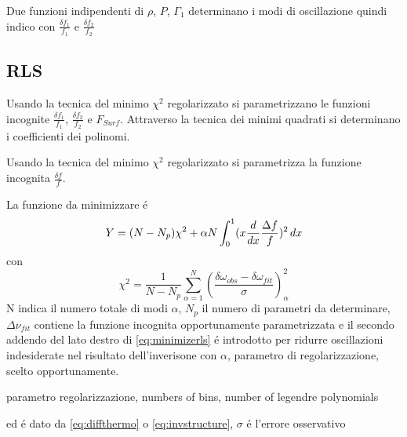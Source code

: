 \documentclass[../main.tex]{subfiles}
\begin{document}
\begin{workout}

Due funzioni indipendenti di $\rho$, $P$, $\Gamma_1$ determinano i modi di oscillazione quindi indico con $\frac{\delta f_1}{f_1}$ e $\frac{\delta f_2}{f_2}$

\end{workout}

\subsection{RLS}

\begin{workout}

Usando la tecnica del minimo $\chi^2$ regolarizzato si parametrizzano le funzioni incognite $\frac{\delta f_1}{f_1}$, $\frac{\delta f_2}{f_2}$ e $F_{Surf}$. Attraverso la tecnica dei minimi quadrati si determinano i coefficienti dei polinomi.

\end{workout}

Usando la tecnica del minimo $\chi^2$ regolarizzato si parametrizza la funzione incognita $\frac{\delta f}{f}$.

La funzione da minimizzare \'e
\begin{equation}
Y=(N-N_p)\chi^2+\alpha N\int_0^1(x\frac{d}{d x}\frac{\Delta f}{f})^2\,dx\label{eq:minimizerls}
\end{equation}
con
\begin{equation}
\chi^2=\frac{1}{N-N_p}\sum_{\alpha=1}^N(\frac{\delta\omega_{obs}-\delta\omega_{fit}}{\sigma})^2_{\alpha}
\end{equation}
N indica il numero totale di modi $\alpha$, $N_p$ il numero di parametri da determinare, $\Delta\nu_{fit}$ contiene la funzione incognita opportunamente parametrizzata e il secondo addendo del lato destro di \eqref{eq:minimizerls} \'e introdotto per ridurre oscillazioni indesiderate nel risultato dell'inverisone con $\alpha$, parametro di regolarizzazione, scelto opportunamente.

\begin{workout}
parametro regolarizzazione, numbers of bins, number of legendre polynomials
\end{workout}

\begin{workout}
ed \'e dato da \eqref{eq:diffthermo} o \eqref{eq:invstructure}, $\sigma$ \'e l'errore osservativo
\end{workout}
\end{document}
